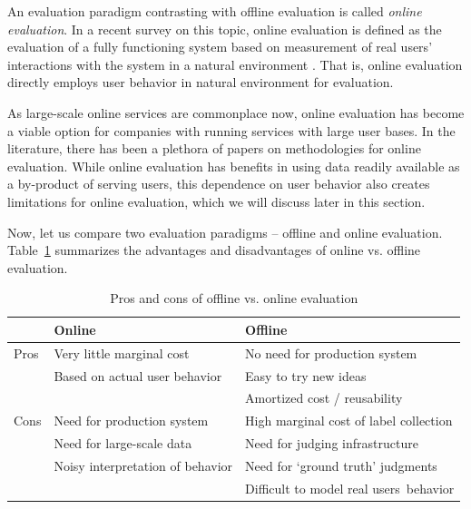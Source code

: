An evaluation paradigm contrasting with offline evaluation is called \textit{online evaluation}. In a recent survey on this topic, online evaluation is defined as the evaluation of a fully functioning system based on measurement of real users' interactions with the system in a natural environment \citep{INR-XYZ}. That is, online evaluation directly employs user behavior in natural environment for evaluation.

As large-scale online services are commonplace now, online evaluation has become a viable option for companies with running services with large user bases. In the literature, there has been a plethora of papers on methodologies for online evaluation. While online evaluation has benefits in using data readily available as a by-product of serving users, this dependence on user behavior also creates limitations for online evaluation, which we will discuss later in this section.



Now, let us compare two evaluation paradigms -- offline and online evaluation. 
Table~\ref{onlinevsoffline} summarizes the advantages and disadvantages of online vs. offline evaluation. %

\begin{table}
	\centering
	\footnotesize
	\caption{Pros and cons of offline vs. online evaluation}
	\begin{tabular}{|l|l|l|} \hline
 & Online & Offline \\ \hline
 Pros & Very little marginal cost & No need for production system \\
 & Based on actual user behavior & Easy to try new ideas \\
 &  & Amortized cost / reusability \\ \hline
 Cons & Need for production system & High marginal cost of label collection \\
 & Need for large-scale data & Need for judging infrastructure \\
 & Noisy interpretation of behavior & Need for `ground truth' judgments \\
 & & Difficult to model real users\ behavior \\
	\hline\end{tabular}
	\label{onlinevsoffline}
\end{table}

